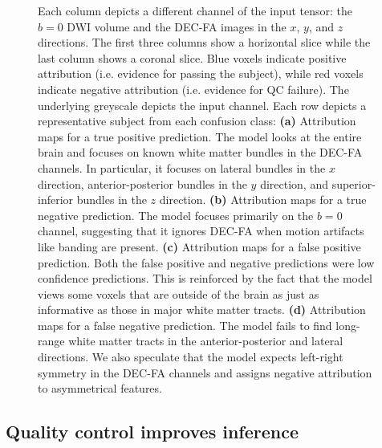 \documentclass[fleqn,10pt]{wlscirep}
\begin{document}
\begin{figure}[tbp]
{        Each column depicts a different channel of the input tensor: the $b=0$
        DWI volume and the DEC-FA images in the $x$, $y$, and $z$ directions.
        The first three columns show a horizontal slice while the last column
        shows a coronal slice. Blue voxels indicate positive attribution (i.e.
        evidence for passing the subject), while red voxels indicate negative
        attribution (i.e. evidence for QC failure). The underlying greyscale
        depicts the input channel. Each row depicts a representative subject
        from each confusion class:
        \textbf{(a)} Attribution maps for a true positive prediction. The model
        looks at the entire brain and focuses on known white matter bundles in
        the DEC-FA channels. In particular, it focuses on lateral bundles in the
        $x$ direction, anterior-posterior bundles in the $y$ direction, and
        superior-inferior bundles in the $z$ direction.
        \textbf{(b)} Attribution maps for a true negative prediction. The model
        focuses primarily on the $b=0$ channel, suggesting that it ignores
        DEC-FA when motion artifacts like banding are present.
        \textbf{(c)} Attribution maps for a false positive prediction. Both the
        false positive and negative predictions were low confidence predictions.
        This is reinforced by the fact that the model views some voxels that are
        outside of the brain as just as informative as those in major white
        matter tracts.
        \textbf{(d)} Attribution maps for a false negative prediction. The model
        fails to find long-range white matter tracts in the anterior-posterior
        and lateral directions. We also speculate that the model expects
        left-right symmetry in the DEC-FA channels and assigns negative
        attribution to asymmetrical features. }
    \label{fig:ig}
\end{figure}

\subsection*{Quality control improves inference}
\end{document}
